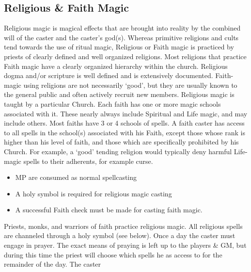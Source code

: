 \documentclass[twoside]{book}
\begin{document}
\subsection{Religious \& Faith Magic}
      Religious magic is magical effects that are brought
               into reality by the combined will of the caster and the
               caster's god(s). Whereas primitive religions and
               cults tend towards the use of ritual magic, Religious or
               Faith magic is practiced by priests of clearly defined and
               well organized religions. Most religions that practice
               Faith magic have a clearly organized hierarchy within the
               church. Religious dogma and/or scripture is well defined
               and is extensively documented. Faith-magic using religions
               are not necessarily `good', but they are
               usually known to the general public and often actively
               recruit new members.   Religious magic is taught by a particular Church.
               Each faith has one or more magic schools associated with
               it. These nearly always include Spiritual and Life magic,
               and may include others. Most faiths have 3 or 4 schools of
               spells. A faith caster has access to all spells in the
               school(s) associated with his Faith, except those whose
               rank is higher than his level of faith, and those which
               are specifically prohibited by his Church. For example, a
               `good' tending religion would typically deny
               harmful Life-magic spells to their adherents, for example
               curse. 
\begin{itemize}
      
  \item   MP are consumed as normal spellcasting 
  \item   A holy symbol is required for religious magic
                 casting 
  \item   A successful Faith check must be made for casting
                 faith magic. 
\end{itemize}
    Priests, monks, and warriors of faith practice
               religious magic. All religious spells are channeled
               through a holy symbol (see below).   Once a day the caster must engage in prayer. The
               exact means of praying is left up to the players \& GM,
               but during this time the priest will choose which spells
               he as access to for the remainder of the day. The caster
\end{document}

